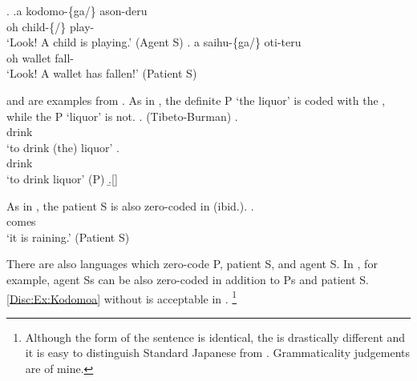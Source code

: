 \ex.\label{Disc:Ex:Kodomo}
	\ag.\label{Disc:Ex:Kodomoa}a kodomo-\{ga/\} ason-deru \\
		oh child-\{/\EM{\O}\} play- \\
		`Look! A child is playing.' \hfill{(Agent S)}
		\bg. a saihu-\{ga/\EM{\O}\} oti-teru \\
			oh wallet fall- \\
			`Look! A wallet has fallen!' \hfill{(Patient S)}

\Next and \NNext are examples from .
As in \Next[a],
the definite P `the liquor' is coded with the ,
while the  P `liquor' is not.
\ex.  (Tibeto-Burman)
 \ag.  {}  \\
	  drink \\
	`to drink (the) liquor'
 \bg.   \\
	 drink \\
	`to drink liquor' \hfill{(P)}
 \b.[] \hfill{\cite[p.\ 307]{matisoff81}}

As in \Next,
the  patient S is also zero-coded in  (ibid.).
	\exg. \footnotemark{}  \\
			 comes \\
			`it is raining.' \hfill{(Patient S)}

%
There are also languages which zero-code P, patient S, and agent S.
In , for example,
agent Ss can be also zero-coded in addition to Ps and patient S.
\ref{Disc:Ex:Kodomoa} without  is acceptable in  \cite[see also][]{nakagawa13m}.%
	\footnote{
	Although the form of the sentence is identical,
	the  is drastically different and it is easy to distinguish Standard Japanese from .
	Grammaticality judgements are of mine.
	}


